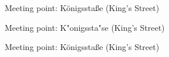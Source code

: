 \documentclass{article}
\begin{document}
\parbox{3cm}{Meeting point: K\"onigssta\ss e (King's Street)}

\parbox{3cm}{Meeting point: K"onigssta"se (King's Street)}

\parbox{3cm}{Meeting point: Königsstaße (King's Street)}
\end{document}
